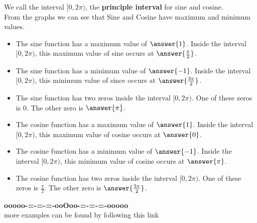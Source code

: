 \documentclass{ximera}
\begin{document}
We call the interval $[0, 2\pi)$, the \textbf{principle interval} for sine and cosine. \\

From the graphs we can see that Sine and Cosine have maximum and minimum values.



\begin{explanation}
\begin{itemize}

  \item The sine function has a maximum value of $\answer{1}$.  Inside the interval $[0, 2\pi)$, this maximum value of sine occurs at $\answer{\frac{\pi}{2}}$.

  \item The sine function has a minimum value of $\answer{-1}$.  Inside the interval $[0, 2\pi)$, this minimum value of since occurs at $\answer{\frac{3\pi}{2}}$.

  \item The sine function has two zeros inside the interval $[0, 2\pi)$. One of these zeros is $0$.  The other zero is $\answer{\pi}$.


\end{itemize}





\begin{itemize}
  
  \item The cosine function has a maximum value of $\answer{1}$.  Inside the interval $[0, 2\pi)$, this maximum value of cosine occurs at $\answer{0}$.

  \item The cosine function has a minimum value of $\answer{-1}$.  Inside the interval $[0, 2\pi)$, this minimum value of cosine occurs at $\answer{\pi}$.

  \item The cosine function has two zeros inside the interval $[0, 2\pi)$. One of these zeros is $\frac{\pi}{2}$.  The other zero is $\answer{\frac{3\pi}{2}}$.


\end{itemize}

\end{explanation}













\begin{onlineOnly}
\begin{center}
\textbf{\textcolor{green!50!black}{ooooo-=-=-=-ooOoo-=-=-=-ooooo}} \\

more examples can be found by following this link\\ 

\end{center}
\end{onlineOnly}
\end{document}
